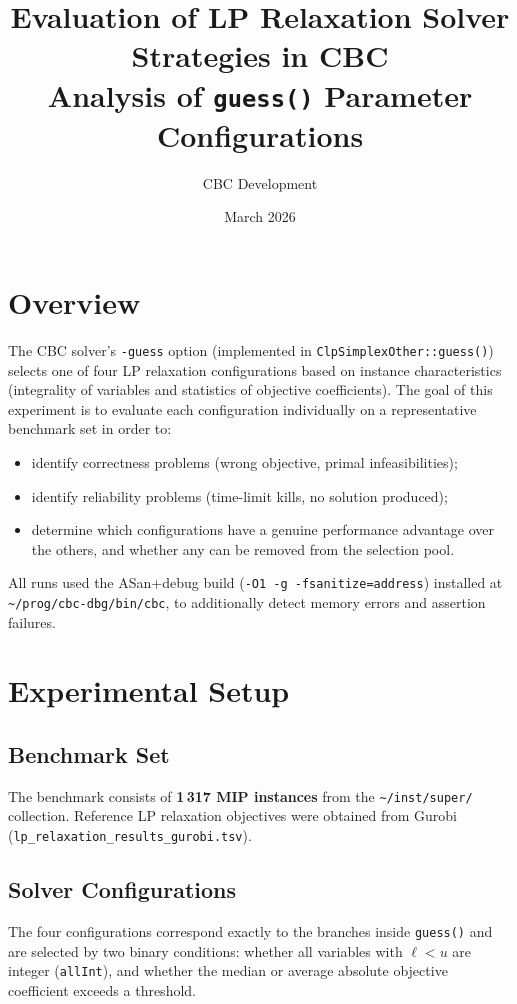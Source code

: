\documentclass[11pt,a4paper]{article}
\title{\textbf{Evaluation of LP Relaxation Solver Strategies in CBC}\\
       \large Analysis of \texttt{guess()} Parameter Configurations}
\author{CBC Development}
\date{March 2026}
\begin{document}
\maketitle
\tableofcontents
\newpage

\section{Overview}

The CBC solver's \texttt{-guess} option (implemented in
\texttt{ClpSimplexOther::guess()}) selects one of four LP relaxation
configurations based on instance characteristics (integrality of variables and
statistics of objective coefficients). The goal of this experiment is to evaluate
each configuration individually on a representative benchmark set in order to:
\begin{itemize}
  \item identify correctness problems (wrong objective, primal infeasibilities);
  \item identify reliability problems (time-limit kills, no solution produced);
  \item determine which configurations have a genuine performance advantage over
        the others, and whether any can be removed from the selection pool.
\end{itemize}

All runs used the ASan+debug build (\texttt{-O1 -g -fsanitize=address}) installed at
\texttt{\textasciitilde/prog/cbc-dbg/bin/cbc}, to additionally detect memory errors
and assertion failures.

\section{Experimental Setup}

\subsection{Benchmark Set}
The benchmark consists of \textbf{1\,317 MIP instances} from the
\texttt{\textasciitilde/inst/super/} collection. Reference LP relaxation
objectives were obtained from Gurobi
(\texttt{lp\_relaxation\_results\_gurobi.tsv}).

\subsection{Solver Configurations}
The four configurations correspond exactly to the branches inside
\texttt{guess()} and are selected by two binary conditions: whether all
variables with $\ell < u$ are integer (\texttt{allInt}), and whether the median
or average absolute objective coefficient exceeds a threshold.
\end{document}
